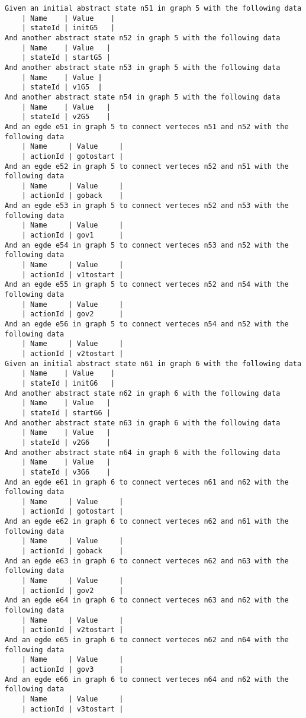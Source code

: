 \begin{lstlisting}[language=Gherkin, caption=Test Scenario's, label=code:gherkin-tests]
Given an initial abstract state n51 in graph 5 with the following data
    | Name    | Value    |
    | stateId | initG5   |
And another abstract state n52 in graph 5 with the following data
    | Name    | Value   |
    | stateId | startG5 |
And another abstract state n53 in graph 5 with the following data
    | Name    | Value |
    | stateId | v1G5  |
And another abstract state n54 in graph 5 with the following data
    | Name    | Value   |
    | stateId | v2G5    |
And an egde e51 in graph 5 to connect verteces n51 and n52 with the following data
    | Name     | Value     |
    | actionId | gotostart |
And an egde e52 in graph 5 to connect verteces n52 and n51 with the following data
    | Name     | Value     |
    | actionId | goback    |
And an egde e53 in graph 5 to connect verteces n52 and n53 with the following data
    | Name     | Value     |
    | actionId | gov1      |
And an egde e54 in graph 5 to connect verteces n53 and n52 with the following data
    | Name     | Value     |
    | actionId | v1tostart |
And an egde e55 in graph 5 to connect verteces n52 and n54 with the following data
    | Name     | Value     |
    | actionId | gov2      |
And an egde e56 in graph 5 to connect verteces n54 and n52 with the following data
    | Name     | Value     |
    | actionId | v2tostart |
Given an initial abstract state n61 in graph 6 with the following data
    | Name    | Value    |
    | stateId | initG6   |
And another abstract state n62 in graph 6 with the following data
    | Name    | Value   |
    | stateId | startG6 |
And another abstract state n63 in graph 6 with the following data
    | Name    | Value   |
    | stateId | v2G6    |
And another abstract state n64 in graph 6 with the following data
    | Name    | Value   |
    | stateId | v3G6    |
And an egde e61 in graph 6 to connect verteces n61 and n62 with the following data
    | Name     | Value     |
    | actionId | gotostart |
And an egde e62 in graph 6 to connect verteces n62 and n61 with the following data
    | Name     | Value     |
    | actionId | goback    |
And an egde e63 in graph 6 to connect verteces n62 and n63 with the following data
    | Name     | Value     |
    | actionId | gov2      |
And an egde e64 in graph 6 to connect verteces n63 and n62 with the following data
    | Name     | Value     |
    | actionId | v2tostart |
And an egde e65 in graph 6 to connect verteces n62 and n64 with the following data
    | Name     | Value     |
    | actionId | gov3      |
And an egde e66 in graph 6 to connect verteces n64 and n62 with the following data
    | Name     | Value     |
    | actionId | v3tostart |


\end{lstlisting}
